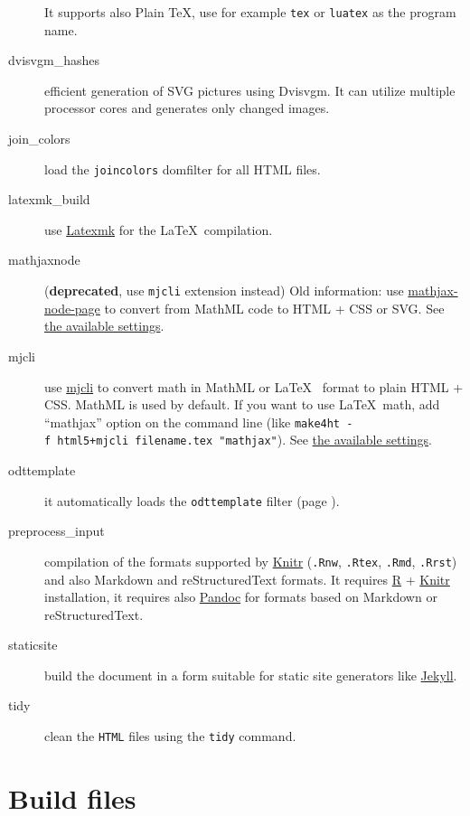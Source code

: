 \begin{description}
It supports also Plain \TeX, use for example \texttt{tex} or
\texttt{luatex} as the program name.
\item[dvisvgm\_hashes]
efficient generation of SVG pictures using Dvisvgm. It can utilize
multiple processor cores and generates only changed images.
\item[join\_colors]
load the \texttt{joincolors} domfilter for all HTML files.
\item[latexmk\_build]
use \href{https://ctan.org/pkg/latexmk?lang=en}{Latexmk} for the
\LaTeX~compilation.
\item[mathjaxnode]
(\textbf{deprecated}, use \texttt{mjcli} extension instead) Old
information: use
\href{https://github.com/pkra/mathjax-node-page/}{mathjax-node-page} to
convert from MathML code to HTML + CSS or SVG. See
\protect\hyperlink{mathjaxsettings}{the available settings}.
\item[mjcli]
use \href{https://github.com/michal-h21/mjcli}{mjcli} to convert math in
MathML or \LaTeX~ format to plain HTML + CSS. MathML is used by default.
If you want to use \LaTeX~math, add ``mathjax'' option on the command
line (like \texttt{make4ht\ -f\ html5+mjcli\ filename.tex\ "mathjax"}).
See \protect\hyperlink{mathjaxsettings}{the available settings}.
\item[odttemplate]
it automatically loads the \texttt{odttemplate} filter (page
\pageref{sec:odttemplate}).
\item[preprocess\_input]
compilation of the formats supported by
\href{https://yihui.name/knitr/}{Knitr} (\texttt{.Rnw}, \texttt{.Rtex},
\texttt{.Rmd}, \texttt{.Rrst}) and also Markdown and reStructuredText
formats. It requires \href{https://www.r-project.org/}{R} +
\href{https://yihui.name/knitr/}{Knitr} installation, it requires also
\href{https://pandoc.org/}{Pandoc} for formats based on Markdown or
reStructuredText.
\item[staticsite]
build the document in a form suitable for static site generators like
\href{https://jekyllrb.com/}{Jekyll}.
\item[tidy]
clean the \texttt{HTML} files using the \texttt{tidy} command.
\end{description}

\hypertarget{build-files}{%
\section{Build files}\label{build-files}}

\label{sec:buildfiles}

